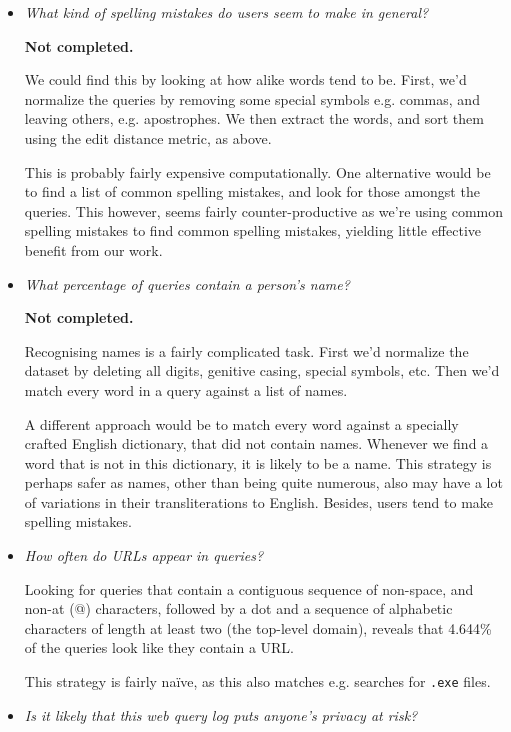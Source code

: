 \begin{itemize}
\item \emph{What kind of spelling mistakes do users seem to make in general?}

\textbf{Not completed.}

We could find this by looking at how alike words tend to be. First, we'd
normalize the queries by removing some special symbols e.g. commas, and leaving
others, e.g. apostrophes. We then extract the words, and sort them using the
edit distance metric, as above.

This is probably fairly expensive computationally. One alternative would be to
find a list of common spelling mistakes\footnotemark, and look for those
amongst the queries. This however, seems fairly counter-productive as we're
using common spelling mistakes to find common spelling mistakes, yielding
little effective benefit from our work.


\item \emph{What percentage of queries contain a person's name?}

\textbf{Not completed.}

Recognising names is a fairly complicated task. First we'd normalize the
dataset by deleting all digits, genitive casing, special symbols, etc. Then
we'd match every word in a query against a list of names.

A different approach would be to match every word against a specially crafted
English dictionary, that did not contain names. Whenever we find a word that is
not in this dictionary, it is likely to be a name. This strategy is perhaps
safer as names, other than being quite numerous, also may have a lot of
variations in their transliterations to English. Besides, users tend to make
spelling mistakes.

\item \emph{How often do URLs appear in queries?}

Looking for queries that contain a contiguous sequence of non-space, and non-at
(@) characters, followed by a dot and a sequence of alphabetic characters of
length at least two (the top-level domain), reveals that 4.644\% of the queries
look like they contain a URL.

This strategy is fairly na\"ive, as this also matches e.g. searches for
\texttt{.exe} files.

\item \emph{Is it likely that this web query log puts anyone's privacy at
risk?}


\end{itemize}
